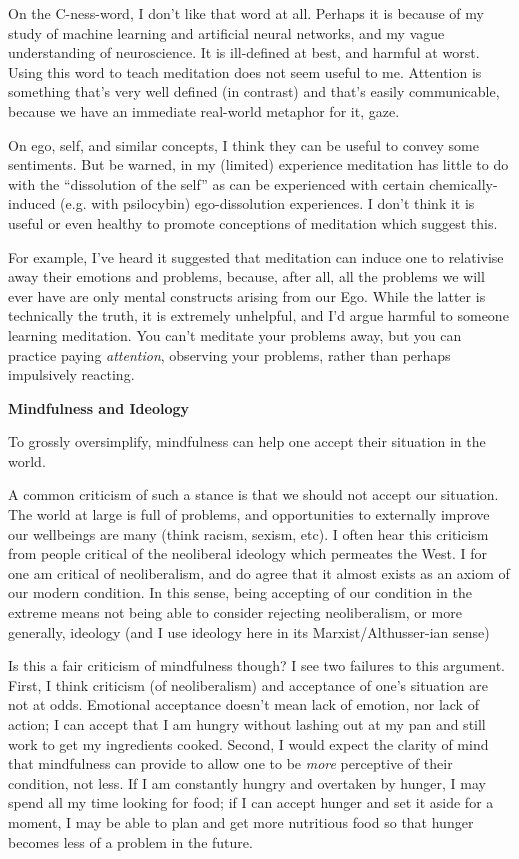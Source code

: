 On the C-ness-word, I don't like that word at all. Perhaps it is because of my study of machine learning and artificial neural networks, and my vague understanding of neuroscience. It is ill-defined at best, and harmful at worst. Using this word to teach meditation does not seem useful to me. Attention is something that's very well defined (in contrast) and that's easily communicable, because we have an immediate real-world metaphor for it, gaze.

On ego, self, and similar concepts, I think they can be useful to convey some sentiments. But be warned, in my (limited) experience meditation has little to do with the ``dissolution of the self'' as can be experienced with certain chemically-induced (e.g. with psilocybin) ego-dissolution experiences. I don't think it is useful or even healthy to promote conceptions of meditation which suggest this.

For example, I've heard it suggested that meditation can induce one to relativise away their emotions and problems, because, after all, all the problems we will ever have are only mental constructs arising from our Ego. While the latter is technically the truth, it is extremely unhelpful, and I'd argue harmful to someone learning meditation. You can't meditate your problems away, but you can practice paying \emph{attention}, observing your problems, rather than perhaps impulsively reacting.

\textbf{Mindfulness and Ideology}

To grossly oversimplify, mindfulness can help one accept their situation in the world.

A common criticism of such a stance is that we should not accept our situation. The world at large is full of problems, and opportunities to externally improve our wellbeings are many (think racism, sexism, etc). I often hear this criticism from people critical of the neoliberal ideology which permeates the West. I for one am critical of neoliberalism, and do agree that it almost exists as an axiom of our modern condition. In this sense, being accepting of our condition in the extreme means not being able to consider rejecting neoliberalism, or more generally, ideology (and I use ideology here in its Marxist/Althusser-ian sense)

Is this a fair criticism of mindfulness though? I see two failures to this argument. First, I think criticism (of neoliberalism) and acceptance of one's situation are not at odds. Emotional acceptance doesn't mean lack of emotion, nor lack of action; I can accept that I am hungry without lashing out at my pan and still work to get my ingredients cooked. Second, I would expect the clarity of mind that mindfulness can provide to allow one to be \emph{more} perceptive of their condition, not less. If I am constantly hungry and overtaken by hunger, I may spend all my time looking for food; if I can accept hunger and set it aside for a moment, I may be able to plan and get more nutritious food so that hunger becomes less of a problem in the future.



